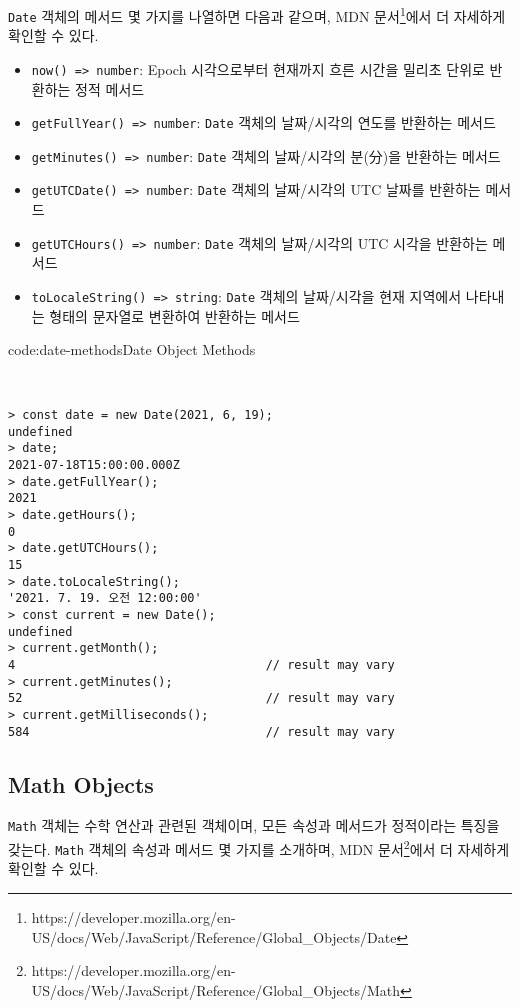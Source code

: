 \texttt{Date} 객체의 메서드 몇 가지를 나열하면 다음과 같으며, MDN 문서\footnote{https://developer.mozilla.org/en-US/docs/Web/JavaScript/Reference/Global\_Objects/Date}에서 더 자세하게 확인할 수 있다.

\begin{itemize}
    \item \texttt{now() => number}: Epoch 시각으로부터 현재까지 흐른 시간을 밀리초 단위로 반환하는 정적 메서드
    \item \texttt{getFullYear() => number}: \texttt{Date} 객체의 날짜/시각의 연도를 반환하는 메서드
    \item \texttt{getMinutes() => number}: \texttt{Date} 객체의 날짜/시각의 분(分)을 반환하는 메서드
    \item \texttt{getUTCDate() => number}: \texttt{Date} 객체의 날짜/시각의 UTC 날짜를 반환하는 메서드
    \item \texttt{getUTCHours() => number}: \texttt{Date} 객체의 날짜/시각의 UTC 시각을 반환하는 메서드
    \item \texttt{toLocaleString() => string}: \texttt{Date} 객체의 날짜/시각을 현재 지역에서 나타내는 형태의 문자열로 변환하여 반환하는 메서드
\end{itemize}

\begin{codeenv}{code:date-methods}{Date Object Methods}\begin{verbatim}


> const date = new Date(2021, 6, 19);
undefined
> date;
2021-07-18T15:00:00.000Z
> date.getFullYear();
2021
> date.getHours();
0
> date.getUTCHours();
15
> date.toLocaleString();
'2021. 7. 19. 오전 12:00:00'
> const current = new Date();
undefined
> current.getMonth();
4                                   // result may vary
> current.getMinutes();
52                                  // result may vary
> current.getMilliseconds();
584                                 // result may vary
\end{verbatim}
\end{codeenv}
\newpage

\subsection*{Math Objects}

\texttt{Math} 객체는 수학 연산과 관련된 객체이며, 모든 속성과 메서드가 정적이라는 특징을 갖는다. \texttt{Math} 객체의 속성과 메서드 몇 가지를 소개하며, MDN 문서\footnote{https://developer.mozilla.org/en-US/docs/Web/JavaScript/Reference/Global\_Objects/Math}에서 더 자세하게 확인할 수 있다.

